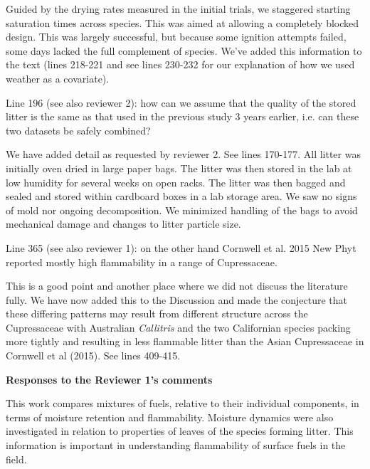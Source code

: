 \documentclass[letterpaper, 12pt]{letter}
\begin{document}
\begin{letter}{}
Guided by the drying rates measured in the initial trials, we staggered
starting saturation times across species. This was aimed at allowing a
completely blocked design. This was largely successful, but because some
ignition attempts failed, some days lacked the full complement of species.
We've added this information to the text (lines 218-221 and see lines 230-232
for our explanation of how we used weather as a covariate).

\begin{quoting}
  Line 196 (see also reviewer 2): how can we assume that the quality of the
  stored litter is the same as that used in the previous study 3 years earlier,
  i.e. can these two datasets be safely combined?
\end{quoting}

We have added detail as requested by reviewer 2. See lines 170-177. All litter
was initially oven dried in large paper bags. The litter was then stored in the
lab at low humidity for several weeks on open racks. The litter was then bagged
and sealed and stored within cardboard boxes in a lab storage area. We saw no
signs of mold nor ongoing decomposition. We minimized handling of the bags to
avoid mechanical damage and changes to litter particle size.


\begin{quoting}
  Line 365 (see also reviewer 1): on the other hand Cornwell et al. 2015 New
  Phyt reported mostly high flammability in a range of Cupressaceae.
\end{quoting}

This is a good point and another place where we did not discuss the literature
fully. We have now added this to the Discussion and made the conjecture that
these differing patterns may result from different structure across the
Cupressaceae with Australian \emph{Callitris} and the two Californian species
packing more tightly and resulting in less flammable litter than the Asian
Cupressaceae in Cornwell et al (2015). See lines 409-415.


{\bf Responses to the Reviewer 1's comments}

\begin{quoting}
  This work compares mixtures of fuels, relative to their individual
  components, in terms of moisture retention and flammability. Moisture
  dynamics were also investigated in relation to properties of leaves of the
  species forming litter. This information is important in understanding
  flammability of surface fuels in the field.


\end{quoting}
\end{letter}
\end{document}
